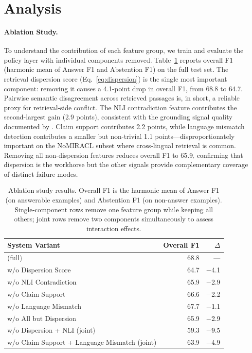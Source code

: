 \section{Analysis}
\label{sec:analysis}

\paragraph{Ablation Study.}
To understand the contribution of each feature group, we train and evaluate the policy layer with individual components removed. Table~\ref{tab:ablation} reports overall F1 (harmonic mean of Answer F1 and Abstention F1) on the full test set. The retrieval dispersion score (Eq.~\ref{eq:dispersion}) is the single most important component: removing it causes a 4.1-point drop in overall F1, from 68.8 to 64.7. Pairwise semantic disagreement across retrieved passages is, in short, a reliable proxy for retrieval-side conflict. The NLI contradiction feature contributes the second-largest gain (2.9 points), consistent with the grounding signal quality documented by \citet{minicheck2024}. Claim support contributes 2.2 points, while language mismatch detection contributes a smaller but non-trivial 1.1 points---disproportionately important on the NoMIRACL subset where cross-lingual retrieval is common. Removing all non-dispersion features reduces overall F1 to 65.9, confirming that dispersion is the workhorse but the other signals provide complementary coverage of distinct failure modes.

\begin{table}[t]
\centering
\small
\begin{tabular}{lrr}
\toprule
System Variant & Overall F1 & $\Delta$ \\
\midrule
\method{} (full)             & 68.8 & --- \\
\quad w/o Dispersion Score   & 64.7 & $-$4.1 \\
\quad w/o NLI Contradiction  & 65.9 & $-$2.9 \\
\quad w/o Claim Support      & 66.6 & $-$2.2 \\
\quad w/o Language Mismatch  & 67.7 & $-$1.1 \\
\quad w/o All but Dispersion & 65.9 & $-$2.9 \\
\midrule
\quad w/o Dispersion + NLI (joint)          & 59.3 & $-$9.5 \\
\quad w/o Claim Support + Language Mismatch (joint) & 63.9 & $-$4.9 \\
\bottomrule
\end{tabular}
\caption{Ablation study results. Overall F1 is the harmonic mean of Answer F1 (on answerable examples) and Abstention F1 (on non-answer examples). Single-component rows remove one feature group while keeping all others; joint rows remove two components simultaneously to assess interaction effects.}
\label{tab:ablation}
\end{table}

